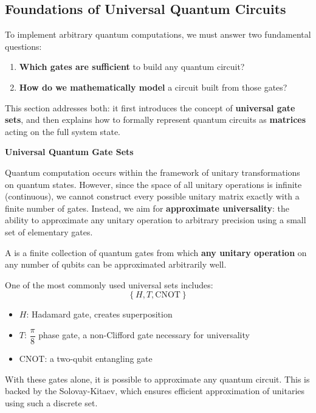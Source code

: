 \subsection{Foundations of Universal Quantum Circuits}

To implement arbitrary quantum computations, we must answer two fundamental questions:
\begin{enumerate}
    \item \textbf{Which gates are sufficient} to build any quantum circuit?
    \item \textbf{How do we mathematically model} a circuit built from those gates?
\end{enumerate}
This section addresses both: it first introduces the concept of \textbf{universal gate sets}, and then explains how to formally represent quantum circuits as \textbf{matrices} acting on the full system state.

\highspace
\begin{flushleft}
    \textcolor{Green3}{ \textbf{Universal Quantum Gate Sets}}
\end{flushleft}
Quantum computation occurs within the framework of unitary transformations on quantum states. However, since the space of all unitary operations is infinite (continuous), we cannot construct every possible unitary matrix exactly with a finite number of gates. Instead, we aim for \textbf{approximate universality}: the ability to approximate any unitary operation to arbitrary precision using a small set of elementary gates.

\highspace
A  is a finite collection of quantum gates from which \textbf{any unitary operation} on any number of qubits can be approximated arbitrarily well.

\begin{examplebox}
    One of the most commonly used universal sets includes:
    \begin{equation*}
        \left\{H, T, \text{CNOT}\right\}
    \end{equation*}
    \begin{itemize}
        \item $H$: Hadamard gate, creates superposition
        \item $T$: $\dfrac{\pi}{8}$ phase gate, a non-Clifford gate necessary for universality
        \item CNOT: a two-qubit entangling gate
    \end{itemize}
    With these gates alone, it is possible to approximate any quantum circuit. This is backed by the Solovay-Kitaev, which ensures efficient approximation of unitaries using such a discrete set.
\end{examplebox}

